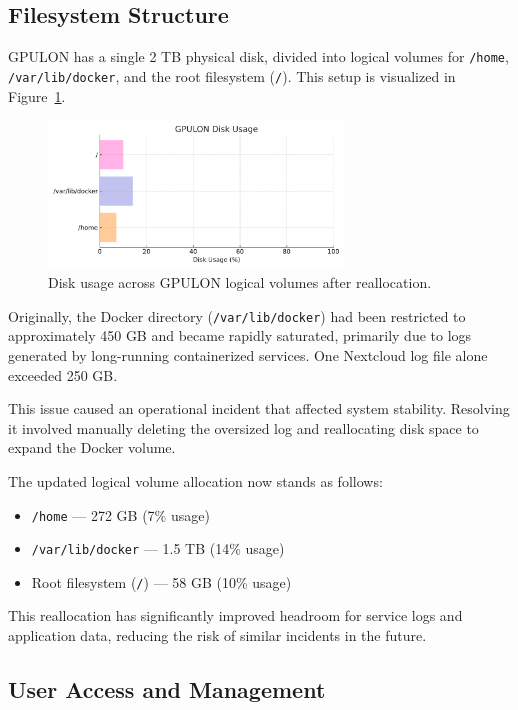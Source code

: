 \subsection{Filesystem Structure}

GPULON has a single 2 TB physical disk, divided into logical volumes for \texttt{/home}, \texttt{/var/lib/docker}, and the root filesystem (\texttt{/}). This setup is visualized in Figure~\ref{fig:gpulon_disk_usage}.

\begin{figure}[H]
  \centering
  \includegraphics[width=0.7\textwidth]{figuras/gpulon_disk_usage.pdf}
  \caption{Disk usage across GPULON logical volumes after reallocation.}
  \label{fig:gpulon_disk_usage}
\end{figure}

Originally, the Docker directory (\texttt{/var/lib/docker}) had been restricted to approximately 450 GB and became rapidly saturated, primarily due to logs generated by long-running containerized services. One Nextcloud log file alone exceeded 250 GB.

This issue caused an operational incident that affected system stability. Resolving it involved manually deleting the oversized log and reallocating disk space to expand the Docker volume.

The updated logical volume allocation now stands as follows:

\begin{itemize}
    \item \texttt{/home} — 272 GB (7\% usage)
    \item \texttt{/var/lib/docker} — 1.5 TB (14\% usage)
    \item Root filesystem (\texttt{/}) — 58 GB (10\% usage)
\end{itemize}

This reallocation has significantly improved headroom for service logs and application data, reducing the risk of similar incidents in the future.

\subsection{User Access and Management}

